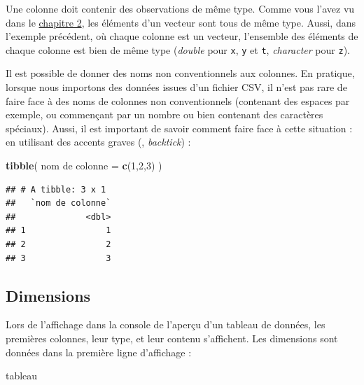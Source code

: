\documentclass[
  11pt,
]{book}
\newenvironment{Shaded}{\begin{snugshade}}{\end{snugshade}}
\newcommand{\AttributeTok}[1]{\textcolor[rgb]{0.13,0.29,0.53}{#1}}
\newcommand{\DecValTok}[1]{\textcolor[rgb]{0.00,0.00,0.81}{#1}}
\newcommand{\FunctionTok}[1]{\textcolor[rgb]{0.13,0.29,0.53}{\textbf{#1}}}
\newcommand{\NormalTok}[1]{#1}
\newcommand{\OtherTok}[1]{\textcolor[rgb]{0.56,0.35,0.01}{#1}}
\newcommand{\StringTok}[1]{\textcolor[rgb]{0.31,0.60,0.02}{#1}}
\numberwithin{equation}{section}
\numberwithin{countremarque}{section}
\begin{document}
Une colonne doit contenir des observations de même type. Comme vous l'avez vu dans le \protect\hyperlink{type-des-donnuxe9es-et-premiuxe8re-structure}{chapitre 2}, les éléments d'un vecteur sont tous de même type. Aussi, dans l'exemple précédent, où chaque colonne est un vecteur, l'ensemble des éléments de chaque colonne est bien de même type (\emph{double} pour \texttt{x}, \texttt{y} et \texttt{t}, \emph{character} pour \texttt{z}).

Il est possible de donner des noms non conventionnels aux colonnes. En pratique, lorsque nous importons des données issues d'un fichier CSV, il n'est pas rare de faire face à des noms de colonnes non conventionnels (contenant des espaces par exemple, ou commençant par un nombre ou bien contenant des caractères spéciaux). Aussi, il est important de savoir comment faire face à cette situation : en utilisant des accents graves (\texttt{\textasciigrave{}}, \emph{backtick}) :

\begin{Shaded}
\begin{Highlighting}[]
\FunctionTok{tibble}\NormalTok{(}
  \StringTok{\textasciigrave{}}\AttributeTok{nom de colonne}\StringTok{\textasciigrave{}} \OtherTok{=} \FunctionTok{c}\NormalTok{(}\DecValTok{1}\NormalTok{,}\DecValTok{2}\NormalTok{,}\DecValTok{3}\NormalTok{)}
\NormalTok{)}
\end{Highlighting}
\end{Shaded}

\begin{lstlisting}
## # A tibble: 3 x 1
##   `nom de colonne`
##              <dbl>
## 1                1
## 2                2
## 3                3
\end{lstlisting}

\hypertarget{dimensions}{%
\subsection{Dimensions}\label{dimensions}}

Lors de l'affichage dans la console de l'aperçu d'un tableau de données, les premières colonnes, leur type, et leur contenu s'affichent. Les dimensions sont données dans la première ligne d'affichage :

\begin{Shaded}
\begin{Highlighting}[]
\NormalTok{tableau}
\end{Highlighting}
\end{Shaded}
\end{document}

